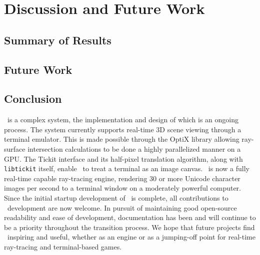 %
%
%

\chapter{Discussion and Future Work}\label{ch:conclusion}

\section{Summary of Results}\label{ch:conclusion:summary}

\section{Future Work}\label{ch:conclusion:future}

\section{Conclusion}\label{ch:conclusion:end}

\name\ is a complex system, the implementation and design of which is an ongoing process.
The system currently supports real-time 3D scene viewing through a terminal emulator.
This is made possible through the OptiX library allowing ray-surface intersection calculations to be done a highly parallelized manner on a GPU.
The Tickit interface and its half-pixel translation algorithm, along with \texttt{libtickit} itself, enable \name\ to treat a terminal as an image canvas.
\name\ is now a fully real-time capable ray-tracing engine, rendering 30 or more Unicode character images per second to a terminal window on a moderately powerful computer.
Since the initial startup development of \name\ is complete, all contributions to \name\ development are now welcome.
In pursuit of maintaining good open-source readability and ease of development, documentation has been and will continue to be a priority throughout the transition process.
We hope that future projects find \name\ inspiring and useful, whether as an engine or as a jumping-off point for real-time ray-tracing and terminal-based games.
